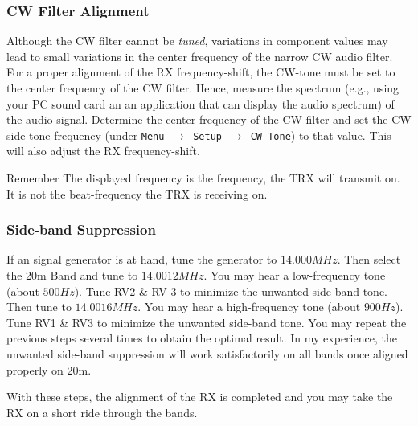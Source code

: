 \documentclass[10pt, a4paper]{scrartcl}
\newenvironment{remember}{\begin{bclogo}[couleur=blue!30,arrondi=.1,logo=\bccrayon,ombre=true]{Remember}}{\end{bclogo}}
\begin{document}
\subsubsection{CW Filter Alignment}
Although the CW filter cannot be \emph{tuned}, variations in component values may lead to small variations in the center frequency of the narrow CW audio filter. For a proper alignment of the RX frequency-shift, the CW-tone must be set to the center frequency of the CW filter. Hence, measure the spectrum (e.g., using your PC sound card an an application that can display the audio spectrum) of the audio signal. Determine the center frequency of the CW filter and set the CW side-tone frequency (under \texttt{Menu}\ $\rightarrow$\ \texttt{Setup}\ $\rightarrow$\ \texttt{CW Tone}) to that value. This will also adjust the RX frequency-shift.

\begin{remember}
The displayed frequency is the frequency, the TRX will transmit on. It is not the beat-frequency the TRX is receiving on.
\end{remember}

\subsubsection{Side-band Suppression}
If an signal generator is at hand, tune the generator to $14.000 MHz$. Then select the 20m Band and tune to $14.0012 MHz$. You may hear a low-frequency tone (about $500Hz$). Tune RV2 \& RV 3 to minimize the unwanted side-band tone. Then tune to $14.0016 MHz$. You may hear a high-frequency tone (about $900 Hz$). Tune RV1 \& RV3 to minimize the unwanted side-band tone. You may repeat the previous steps several times to obtain the optimal result. In my experience, the unwanted side-band suppression will work satisfactorily on all bands once aligned properly on 20m. 

With these steps, the alignment of the RX is completed and you may take the RX on a short ride through the bands.
\end{document}

